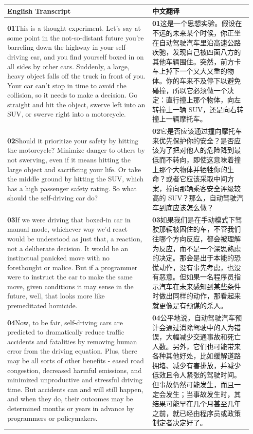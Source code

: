 \documentclass[UTF8,zihao=-4,fontset=fandol]{ctexart}
\newcommand{\TranscriptColumn}{\raggedright\arraybackslash\hyphenpenalty=10000\exhyphenpenalty=10000\sloppy}
\begin{document}
\renewcommand{\arraystretch}{1.23}
\begin{longtable}{>{\TranscriptColumn}p{} >{\TranscriptColumn}p{}}
\rowcolor{headerBg}\textbf{English Transcript} & \textbf{中文翻译} \\ \hline
\textbf{01}\quad This is a thought experiment. Let's say at some point in the not-so-distant future you're barreling down the highway in your self-driving car, and you find yourself boxed in on all sides by other cars. Suddenly, a large, heavy object falls off the truck in front of you. Your car can't stop in time to avoid the collision, so it needs to make a decision. Go straight and hit the object, swerve left into an SUV, or swerve right into a motorcycle. & \textbf{01}\quad 这是一个思想实验。假设在不远的未来某个时候，你正坐在自动驾驶汽车里沿高速公路疾驰，发现自己被四面八方的其他车辆围住。突然，前方卡车上掉下一个又大又重的物体。你的车来不及停下以避免碰撞，所以它必须做一个决定：直行撞上那个物体，向左转撞上一辆 SUV，还是向右转撞上一辆摩托车。 \\ \hline
\textbf{02}\quad Should it prioritize your safety by hitting the motorcycle? Minimize danger to others by not swerving, even if it means hitting the large object and sacrificing your life. Or take the middle ground by hitting the SUV, which has a high passenger safety rating. So what should the self-driving car do? & \textbf{02}\quad 它是否应该通过撞向摩托车来优先保护你的安全？是否应该为了把对他人的危险降到最低而不转向，即使这意味着撞上那个大物体并牺牲你的生命？或者它应该采取中间方案，撞向那辆乘客安全评级较高的 SUV？那么，自动驾驶汽车到底应该怎么做？ \\ \hline
\textbf{03}\quad If we were driving that boxed-in car in manual mode, whichever way we'd react would be understood as just that, a reaction, not a deliberate decision. It would be an instinctual panicked move with no forethought or malice. But if a programmer were to instruct the car to make the same move, given conditions it may sense in the future, well, that looks more like premeditated homicide. & \textbf{03}\quad 如果我们是在手动模式下驾驶那辆被困住的车，不管我们往哪个方向反应，都会被理解为反应，而不是一个深思熟虑的决定。那会是出于本能的恐慌动作，没有事先考虑，也没有恶意。但如果一名程序员指示汽车在未来感知到某些条件时做出同样的动作，那看起来就更像是有预谋的杀人。 \\ \hline
\textbf{04}\quad Now, to be fair, self-driving cars are predicted to dramatically reduce traffic accidents and fatalities by removing human error from the driving equation. Plus, there may be all sorts of other benefits - eased road congestion, decreased harmful emissions, and minimized unproductive and stressful driving time. But accidents can and will still happen, and when they do, their outcomes may be determined months or years in advance by programmers or policymakers. & \textbf{04}\quad 公平地说，自动驾驶汽车预计会通过消除驾驶中的人为错误，大幅减少交通事故和死亡人数。另外，它们也可能带来各种其他好处，比如缓解道路拥堵、减少有害排放，并减少低效且令人紧张的驾驶时间。但事故仍然可能发生，而且一定会发生；当事故发生时，其结果可能早在几个月甚至几年之前，就已经由程序员或政策制定者决定好了。 \\ \hline
\end{longtable}
\end{document}

